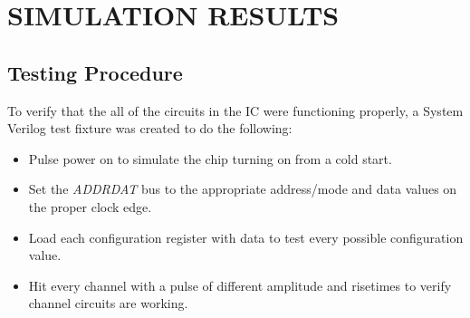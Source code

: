 \documentclass[12pt,oneside,final]{siuethesis}
\theoremstyle{definition}
\begin{document}
\chapter{SIMULATION RESULTS}

\section{Testing Procedure}
\par To verify that the all of the circuits in the IC were functioning properly, a System Verilog test fixture was created to do the following:
\begin{itemize}
\item Pulse power on to simulate the chip turning on from a cold start.
\item Set the \emph{ADDRDAT} bus to the appropriate address/mode and data values on the proper clock edge.
\item Load each configuration register with data to test every possible configuration value.
\item Hit every channel with a pulse of different amplitude and risetimes to verify channel circuits are working.
\end{itemize}
\end{document}
